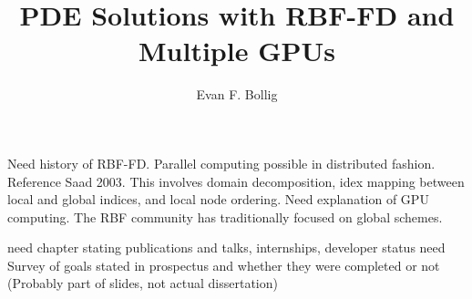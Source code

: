 \documentclass[11pt]{fsuthesis}
\title{PDE Solutions with RBF-FD and Multiple GPUs}
\author{Evan F. Bollig}
\begin{document}

\mainmatter

Need history of RBF-FD. 
Parallel computing possible in distributed fashion. Reference Saad 2003. This involves domain decomposition, idex mapping between local and global indices, and local node ordering. 
Need explanation of GPU computing. 
The RBF community has traditionally focused on global schemes. 




 
 

need chapter stating publications and talks, internships, developer status
need Survey of goals stated in prospectus and whether they were completed or not (Probably part of slides, not actual dissertation)


\end{document}
